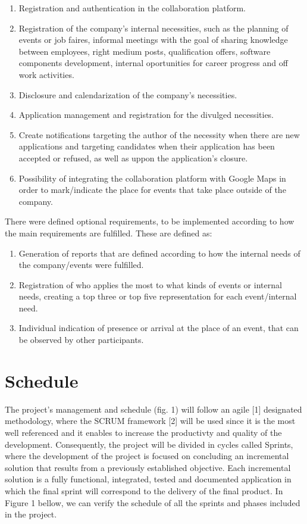 \documentclass[a4paper,openright,12pt]{report}
\begin{document}
\begin{enumerate}
\item Registration and authentication in the collaboration platform.
\item Registration of the company's internal necessities, such as the planning of events or job faires, informal meetings with the goal of sharing knowledge between employees, right medium posts, qualification offers, software components development, internal oportunities for career progress and off work activities.
\item Disclosure and calendarization of the company's necessities.
\item Application management and registration for the divulged necessities.
\item Create notifications targeting the author of the necessity when there are new applications and targeting candidates when their application has been accepted or refused, as well as uppon the application's closure.
\item Possibility of integrating the collaboration platform with Google Maps in order to mark/indicate the place for events that take place outside of the company.
\end{enumerate}

There were defined optional requirements, to be implemented according to how the main requirements are fulfilled. These are defined as:

\begin{enumerate}
\item Generation of reports that are defined according to how the internal needs of the company/events were fulfilled.
\item Registration of who applies the most to what kinds of events or internal needs, creating a top three or top five representation for each event/internal need. 
\item Individual indication of presence or arrival at the place of an event, that can be observed by other participants.
\end{enumerate}

\section*{Schedule} 

The project's management and schedule (fig. 1) will follow an agile [1] designated methodology, where the SCRUM framework [2] will be used since it is the most well referenced and it enables to increase the productivty and quality of the development. Consequently, the project will be divided in cycles called Sprints, where the development of the project is focused on concluding an incremental solution that results from a previously established objective. Each incremental solution  is a fully functional, integrated, tested and documented application in which the final sprint will correspond to the delivery of the final product. In Figure 1 bellow, we can verify the schedule of all the sprints and phases included in the project.
\end{document}
